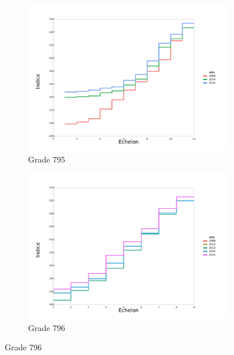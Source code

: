 \documentclass[11pt,a4paper]{article}
\begin{document}
\begin{figure}[ht]
\begin{subfigure}[b]{0.55\linewidth}
        \caption{Grade 795} 
    \label{echelon_by_neg_2} 
    \centering
    \includegraphics[width=1\linewidth]{AT_795_grille_by_neg.pdf} 
  \end{subfigure}%
  \begin{subfigure}[b]{0.55\linewidth}
        \caption{Grade 796} 
    \label{echelon_by_neg_3} 
    \centering
    \includegraphics[width=1\linewidth]{AT_796_grille_by_neg.pdf} 
  \end{subfigure} 
\end{figure}
\end{document}
